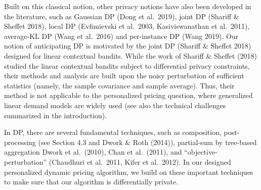 Built on this classical notion, other privacy notions have also been developed in the literature, such as Gaussian DP (Dong et al.~2019), joint DP (Shariff \& Sheffet 2018), local DP (Evfimievski et al.~2003, Kasiviswanathan et al.~2011), average-KL DP (Wang et al.~2016) and per-instance DP (Wang 2019). Our notion of anticipating DP is motivated by the joint DP (Shariff \& Sheffet 2018) designed for linear contextual bandits. While the work of Shariff \& Sheffet (2018) studied the linear contextual bandits subject to differential privacy constraints, their methods and analysis are built upon the noisy perturbation of sufficient statistics (namely, the sample covariance and sample average). Thus, their method is not applicable to the personalized pricing question, where generalized linear demand models are widely used (see also the technical challenges summarized in the introduction).

In DP, there are several fundamental techniques, such as composition, post-processing (see Section 4.3 and Dwork \& Roth (2014)), partial-sum by tree-based aggregation Dwork et al.~(2010), Chan et al.~(2011), and ``objective-perturbation'' (Chaudhuri et al.~2011, Kifer et al.~2012). In our designed personalized dynamic pricing algorithm, we build on these important techniques to make sure that our algorithm is differentially private.

